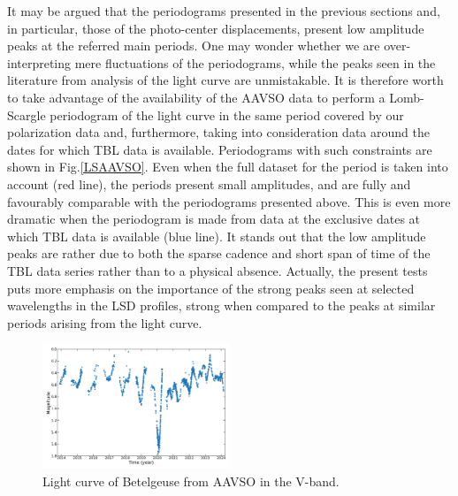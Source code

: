 \documentclass{aa}
\begin{document}
It may be argued that the periodograms presented in the previous sections and, in particular, those  of the photo-center displacements, 
present low amplitude peaks at the referred main periods. One may wonder whether we are over-interpreting mere fluctuations of the periodograms, 
while the peaks seen in the literature from analysis of the light curve are unmistakable. It is therefore worth to take advantage of the 
availability of the AAVSO data to perform a Lomb-Scargle periodogram of the light curve in the same period covered by our polarization data and,
furthermore, taking into consideration data around the dates for which TBL data is available. Periodograms  with such constraints are 
shown in Fig.\ref{LSAAVSO}. Even when the full dataset for the period is taken into account (red line), the periods present small amplitudes, and are 
fully and favourably comparable with the periodograms presented above. This is even more dramatic when the periodogram is made from data at the exclusive 
dates at which TBL data is available (blue line). It stands out that the low amplitude peaks are rather due to both the sparse cadence and short span of 
time of the TBL data series rather than to a physical absence. Actually, the present tests puts more emphasis on the importance of the 
strong peaks seen at selected wavelengths in the LSD profiles, strong when compared to the peaks at similar periods arising from the light curve. 

\begin{figure}[!h]
    \centering
    \includegraphics[width=0.5\textwidth]{Light_curve_Betelgeuse.png}
    \caption{Light curve of Betelgeuse from AAVSO in the V-band.}
    \label{light curve Betelgeuse}
\end{figure}
\end{document}
